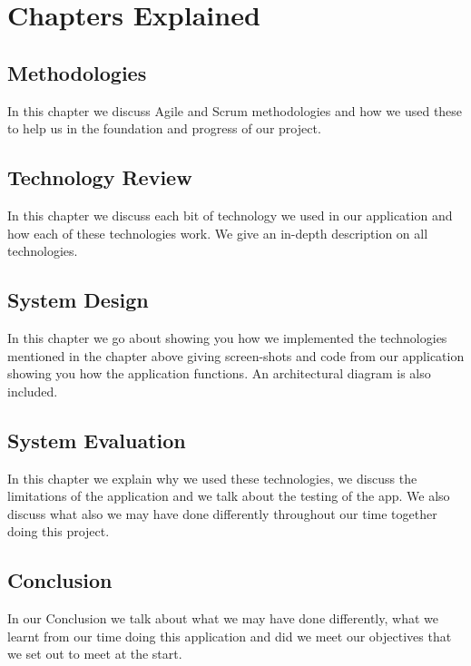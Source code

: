 \section{Chapters Explained}
\subsection{Methodologies}
In this chapter we discuss Agile and Scrum methodologies and how we used these to help us in the foundation and progress of our project.

\subsection{Technology Review}
In this chapter we discuss each bit of technology we used in our application and how each of these technologies work. We give an in-depth description on all technologies.

\subsection{System Design}
In this chapter we go about showing you how we implemented the technologies mentioned in the chapter above giving screen-shots and code from our application showing you how the application functions. An architectural diagram is also included.

\subsection{System Evaluation}
In this chapter we explain why we used these technologies, we discuss the limitations of the application and we talk about the testing of the app. We also discuss what also we may have done differently throughout our time together doing this project.

\subsection{Conclusion}
In our Conclusion we talk about what we may have done differently, what we learnt from our time doing this application and did we meet our objectives that we set out to meet at the start.

